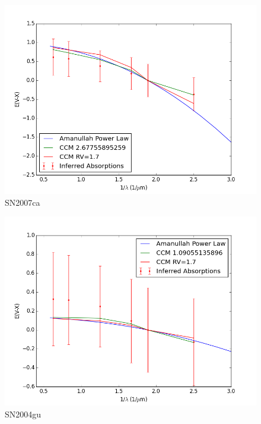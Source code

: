 \documentclass{article}
\begin{document}
\begin{figure}
\includegraphics[width=.8\textwidth]{../2007ca_redlaw.png}
\caption{SN2007ca}
\end{figure}

\begin{figure}
\includegraphics[width=.8\textwidth]{../2004gu_redlaw.png}
\caption{SN2004gu}
\end{figure}
\end{document}
